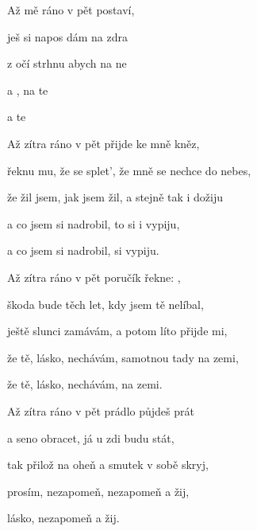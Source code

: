 

\zs
Až mě  ráno v pět
 postaví,

ješ si napos
dám  na zdra

z očí  {strhnu} 
abych  na ne

a  
, na te
   

a   te
\ks

\zs
Až zítra ráno v pět přijde ke mně kněz,

řeknu mu, že se splet', že mně se nechce do nebes,

že žil jsem, jak jsem žil, a stejně tak i dožiju

a co jsem si nadrobil, to si i vypiju,

a co jsem si nadrobil, si vypiju.
\ks

\zs
Až zítra ráno v pět poručík řekne: ,

škoda bude těch let, kdy jsem tě nelíbal,

ještě slunci zamávám, a potom líto přijde mi,

že tě, lásko, nechávám, samotnou tady na zemi,

že tě, lásko, nechávám, na zemi.
\ks

\zs
Až zítra ráno v pět prádlo půjdeš prát

a seno obracet, já u zdi budu stát,

tak přilož na oheň a smutek v sobě skryj,

prosím, nezapomeň, nezapomeň a žij,

lásko, nezapomeň a žij.
\ks

\kp























